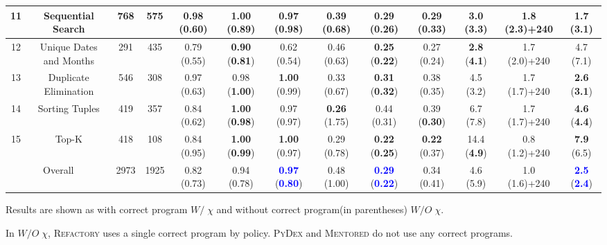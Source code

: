 \documentclass[10pt,conference]{IEEEtran}
\begin{document}
\begin{table}[hb!]
{\begin{tabular}{ |c|c|c|c|ccc|ccc|ccc| }
            \hline
            11 & Sequential Search & 768 & 575 & 
            0.98 (0.60)& \textbf{1.00} (0.89) & 0.97 (\textbf{0.98}) & 
            0.39 (0.68) & \textbf{0.29} (\textbf{0.26}) & \textbf{0.29} (0.33) & 
            3.0 (3.3) & 1.8 (2.3)+240 & \textbf{1.7} (\textbf{3.1}) \\
            \hline
            12 & Unique Dates and Months & 291 & 435 & 
            0.79 (0.55)& \textbf{0.90} (\textbf{0.81}) & 0.62 (0.54) & 
            0.46 (0.63) & \textbf{0.25} (\textbf{0.22}) & 0.27 (0.24) & 
            \textbf{2.8} (\textbf{4.1}) & 1.7 (2.0)+240 & 4.7 (7.1) \\
            \hline
            13 & Duplicate Elimination & 546 & 308 & 
            0.97 (0.63)& 0.98 (\textbf{1.00}) & \textbf{1.00} (0.99) & 
            0.33 (0.67) & \textbf{0.31} (\textbf{0.32}) & 0.38 (0.35) & 
            4.5 (3.2) & 1.7 (1.7)+240 & \textbf{2.6} (\textbf{3.1}) \\
            \hline
            14 & Sorting Tuples & 419 & 357 & 
            0.84 (0.62)& \textbf{1.00} (\textbf{0.98}) & 0.97 (0.97) & 
            \textbf{0.26} (1.75) & 0.44 (0.31) & 0.39 (\textbf{0.30}) & 
            6.7 (7.8) & 1.7 (1.7)+240 & \textbf{4.6} (\textbf{4.4}) \\
            \hline
            15 & Top-K & 418 & 108 & 
            0.84 (0.95)& \textbf{1.00} (\textbf{0.99}) & \textbf{1.00} (0.97) & 
            0.29 (0.78) & \textbf{0.22} (\textbf{0.25}) & \textbf{0.22} (0.37) & 
            14.4 (\textbf{4.9}) & 0.8 (1.2)+240 & \textbf{7.9} (6.5) \\
            \hline\hline
            \multicolumn{2}{|c|}{Overall} & 2973 & 1925 & 
            0.82 (0.73) & 0.94 (0.78) & \textbf{\textcolor{blue}{0.97}} (\textbf{\textcolor{blue}{0.80}}) & 
            0.48 (1.00) & \textbf{\textcolor{blue}{0.29}} (\textbf{\textcolor{blue}{0.22}}) & 0.34 (0.41) & 
            4.6 (5.9) & 1.0 (1.6)+240 & \textbf{\textcolor{blue}{2.5}} (\textbf{\textcolor{blue}{2.4}}) \\
            \hline
        \end{tabular}
    }
    \begin{tablenotes}
        \item Results are shown as with correct program $W/\;\chi$ and without correct program(in parentheses) $W/O\;\chi$.
        \item In $W/O\;\chi$, \textsc{Refactory} uses a single correct program by policy. \textsc{PyDex} and \textsc{Mentored} do not use any correct programs.
    \end{tablenotes}
\end{table}
\end{document}
